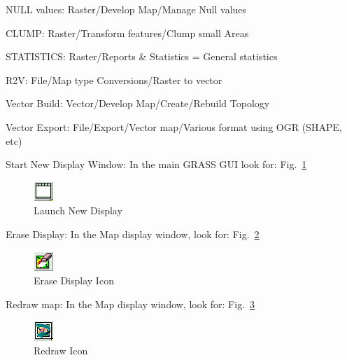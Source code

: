 NULL values: Raster/Develop Map/Manage Null values

CLUMP: Raster/Transform features/Clump small Areas

STATISTICS: Raster/Reports \& Statistics = General statistics

R2V: File/Map type Conversions/Raster to vector

Vector Build: Vector/Develop Map/Create/Rebuild Topology

Vector Export: File/Export/Vector map/Various format using OGR (SHAPE, etc)

Start New Display Window:
In the main GRASS GUI look for:    Fig.~\ref{fig:grass018}

\begin{figure}[htbp]
   \centering
   \includegraphics[scale=1]{grass018.png}
   \caption{Launch New Display}
   \label{fig:grass018}
\end{figure}

Erase Display:
In the Map display window, look for:   Fig.~\ref{fig:grass019}

\begin{figure}[htbp]
   \centering
   \includegraphics[scale=1]{grass019.png}
   \caption{Erase Display Icon}
   \label{fig:grass019}
\end{figure}

Redraw map:
In the Map display window, look for:   Fig.~\ref{fig:grass020}

\begin{figure}[htbp]
   \centering
   \includegraphics[scale=1]{grass020.png}
   \caption{Redraw Icon}
   \label{fig:grass020}
\end{figure}

